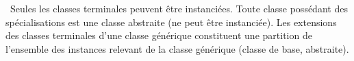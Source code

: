  Seules les classes terminales peuvent être instanciées. Toute classe possédant des spécialisations est une classe abstraite (ne peut être instanciée). Les extensions des classes terminales d'une classe générique constituent une partition de l'ensemble des instances relevant de la classe générique (classe de base, abstraite).
